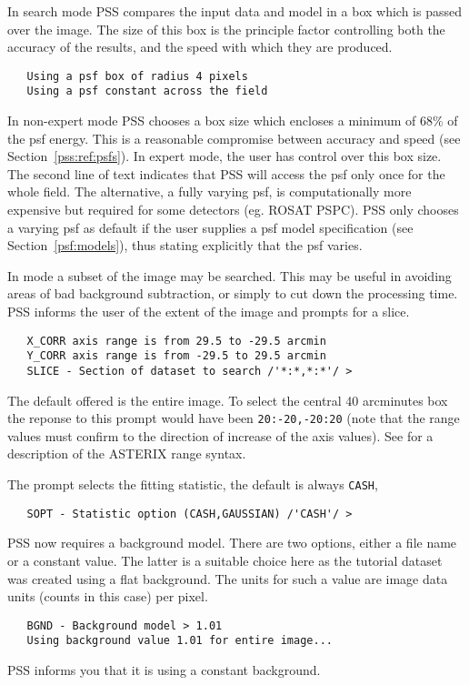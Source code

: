 In search mode PSS compares the input data and model in a box which
is passed over the image. The size
of this box is the principle factor controlling both the accuracy of 
the results, and the speed with which they are produced.
\begin{verbatim}
   Using a psf box of radius 4 pixels
   Using a psf constant across the field
\end{verbatim}
In non-expert mode PSS chooses a box size which encloses a minimum of
68\% of the psf energy. This is a reasonable compromise between accuracy
and speed (see Section~\ref{pss:ref:psfs}).
In expert mode, the user has control over this box size. The second line of text
indicates that PSS will access the psf only once for the whole field.
The alternative, a fully varying psf, is computationally more expensive
but required for some detectors (eg. ROSAT PSPC). PSS only chooses a
varying psf as default if the user supplies a psf model specification
(see Section~\ref{psf:models}), thus stating explicitly that the psf varies.

In  mode a subset of the image may be searched. This may be useful
in avoiding areas of bad background subtraction, or simply to cut down the
processing time. PSS informs the user of the extent of the image and 
prompts for a slice.
\begin{verbatim}
   X_CORR axis range is from 29.5 to -29.5 arcmin
   Y_CORR axis range is from -29.5 to 29.5 arcmin
   SLICE - Section of dataset to search /'*:*,*:*'/ > 
\end{verbatim}
The default offered is the entire image. To select the central
40 arcminutes box the reponse to this prompt would have been
\verb+20:-20,-20:20+ (note that the range values must confirm to the
direction of increase of the axis values). See 
for a description of the ASTERIX range syntax. 

The  prompt selects the fitting statistic, the default is always
\verb+CASH+,
\begin{verbatim}
   SOPT - Statistic option (CASH,GAUSSIAN) /'CASH'/ > 
\end{verbatim}

PSS now requires a background model. There are two options, either
a file name or a constant value. The latter is a suitable choice here as
the tutorial dataset was created using a flat background. The units for 
such a value are image data units (counts in this case) per pixel.
\begin{verbatim}
   BGND - Background model > 1.01
   Using background value 1.01 for entire image...
\end{verbatim}
PSS informs you that it is using a constant background.


